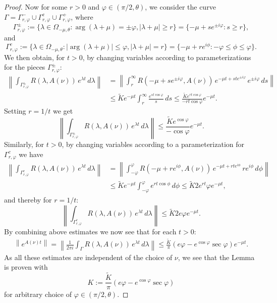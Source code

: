 \documentclass[a4paper]{siamart190516}
\begin{document}
\begin{proof}
 Now for some $r > 0$ and $\varphi \in (\pi/2,\theta)$, we consider the curve $\Gamma = \Gamma^-_{r,\varphi} \cup \Gamma^c_{r,\varphi} \cup \Gamma^+_{r,\varphi}$,
 where
 \[
 \Gamma^{\pm}_{r,\varphi} := \{ \lambda \in \Omega_{-\mu, \theta}: \arg(\lambda + \mu) = \pm \varphi, |\lambda + \mu| \geq r \} = \{ -\mu + se^{\pm i \varphi}: s \geq r \},
 \]
 and
 \[
  \Gamma^{c}_{r,\varphi} := \{ \lambda \in \Omega_{-\mu, \theta}: | \arg(\lambda + \mu)| \leq \varphi, |\lambda + \mu| = r \} = \{ -\mu + re^{i \phi}: -\varphi \leq \phi \leq \varphi  \}.
 \]
 We then obtain, for $t > 0$, by changing variables according to parameterizations for the pieces $\Gamma^{\pm}_{r,\varphi}$:
 \begin{align*}
 \left\| \int_{ \Gamma^{\pm}_{r,\varphi}} R(\lambda, A(\nu)) \, e^{\lambda t} \, d\lambda \right\| &=   \left\|  \int_r^{\infty} R(-\mu+se^{\pm i \varphi}, A(\nu)) \, e^{-\mu t + s t e^{\pm i \varphi}}  \, e^{\pm i \varphi} \, ds \right\| \\
 &\leq \tilde{K} e^{-\mu t}\int_r^{\infty} \frac{e^{s t \cos \varphi}}{s} \, ds \leq \frac{\tilde {K} e^{rt \cos \varphi}}{- r t \cos \varphi} e^{-\mu t}.
 \end{align*}
 Setting $r = 1 / t$ we get
 \[
  \left\| \int_{ \Gamma^{\pm}_{r,\varphi}} R(\lambda, A(\nu)) \, e^{\lambda t} \, d\lambda \right\| \leq  \frac{\tilde {K} e^{\cos \varphi}}{-\cos \varphi} e^{-\mu t}.
 \]
Similarly, for $t > 0$, by changing variables according to a parameterization for $\Gamma^{c}_{r,\varphi}$ we have
 \begin{align*}
 \left\|  \int_{ \Gamma^{c}_{r,\varphi}} R(\lambda, A(\nu)) \, e^{\lambda t} \, d\lambda  \right\| &=   \left\|   \int_{-\varphi}^{\varphi} R(-\mu+re^{ i \phi}, A(\nu)) \, e^{-\mu t + r t e^{ i \phi}}  \, r e^{ i \phi} \, d\phi \right\| \\
 &\leq \tilde{K} e^{-\mu t}\int_{-\varphi}^{\varphi} e^{r t \cos \phi} \, d\phi \leq \tilde {K} 2 e^{rt} \varphi e^{-\mu t},
 \end{align*}
 and thereby for $r = 1 / t$:
 \[
  \left\|  \int_{\Gamma^{c}_{r,\varphi}} R(\lambda, A(\nu)) \, e^{\lambda t} \, d\lambda  \right\|  \leq \tilde {K} 2 e \varphi e^{-\mu t}.
 \]
 By combining above estimates we now see that for each $t > 0$:
 \begin{align*}
 \left\| e^{A(\nu) t} \right\| =  \left\|  \frac{1}{2\pi i}  \int_{\Gamma} R(\lambda, A(\nu)) \, e^{\lambda t} \, d\lambda  \right\| \leq \frac{\tilde{K}}{\pi} \left(  e \varphi - e^{\cos \varphi} \sec \varphi  \right) e^{-\mu t}.
 \end{align*}
 As all these estimates are independent of the choice of $\nu$, we see that the Lemma is proven with
 \[
K :=  \frac{\tilde{K}}{\pi} \left(  e \varphi - e^{\cos \varphi} \sec \varphi  \right)
 \]
 for arbitrary choice of $\varphi \in (\pi/2, \theta)$.
 \end{proof}
 
\end{document}
